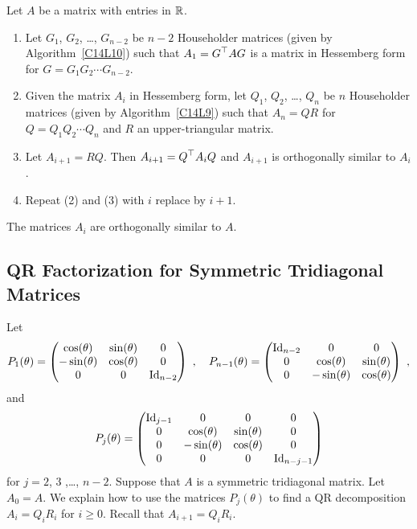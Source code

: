 \begin{algo}
Let $A$ be a \nn matrix with entries in $\mathbb{R}$.
\begin{enumerate}
\item Let $G_1$, $G_2$, \ldots, $G_{n-2}$ be $n-2$ Householder
matrices (given by Algorithm~\ref{C14L10}) such that
$\displaystyle A_1 = G^\top A G$ is a matrix in Hessemberg form for
$G=G_1 G_2 \cdots G_{n-2}$.
\item Given the \nn matrix $A_i$ in Hessemberg form, let $Q_1$, $Q_2$,
\ldots, $Q_n$ be $n$ Householder matrices (given by
Algorithm~\ref{C14L9}) such that $A_n = Q R$ for
$Q= Q_1 Q_2 \cdots Q_n$ and $R$ an upper-triangular \nn matrix.
\item Let $A_{i+1} = RQ$.  Then $\displaystyle A_{i+1} = Q^\top A_i Q$ and
$A_{i+1}$ is orthogonally similar to $A_i$.
\item Repeat (2) and (3) with $i$ replace by $i+1$.
\end{enumerate}
The matrices $A_i$ are orthogonally similar to $A$.
\end{algo}

\subsection{QR Factorization for Symmetric Tridiagonal Matrices}

Let
\[
P_1(\theta) =
\begin{pmatrix}
\cos(\theta) & \sin(\theta) & 0 \\
-\sin(\theta) & \cos(\theta) & 0 \\
0 & 0 & \operatorname{Id}_{n-2}
\end{pmatrix}
\ , \quad
P_{n-1}(\theta) =
\begin{pmatrix}
\operatorname{Id}_{n-2} & 0 & 0 \\
0 & \cos(\theta) & \sin(\theta) \\
0 & -\sin(\theta) & \cos(\theta) \\
\end{pmatrix} \ ,
\]
and
\[
P_j(\theta) =
\begin{pmatrix}
\operatorname{Id}_{j-1} & 0 & 0 & 0 \\
0 & \cos(\theta) & \sin(\theta) & 0 \\
0 & -\sin(\theta) & \cos(\theta) & 0 \\
0 & 0 & 0 & \operatorname{Id}_{n-j-1}
\end{pmatrix}
\]
for $j=2$, $3$ ,\ldots, $n-2$.  Suppose that $A$ is a symmetric tridiagonal
matrix.  Let $A_0 = A$.  We explain how to use the matrices $P_j(\theta)$ to
find a QR decomposition $A_i = Q_i R_i$ for $i \geq 0$.  Recall that
$A_{i+1} = Q_i R_i$.

